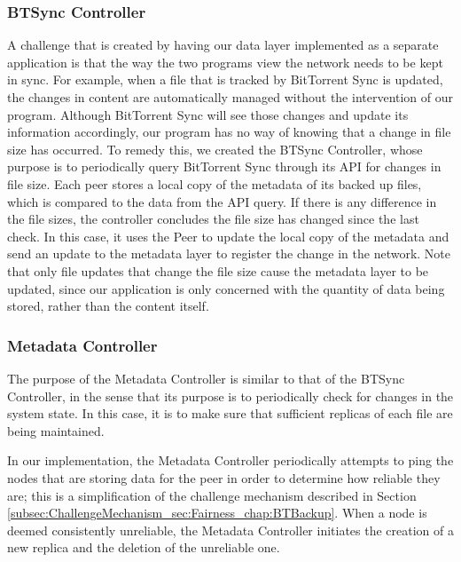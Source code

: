 \documentclass[12pt]{report}
\begin{document}
\subsubsection{BTSync Controller} \label{subsubsec:BTSyncController_subsec:SystemCore_sec:SystemDesign_chap:Implementation}
A challenge that is created by having our data layer implemented as a separate application is that the way the two programs view the network needs to be kept in sync. For example, when a file that is tracked by BitTorrent Sync is updated, the changes in content are automatically managed without the intervention of our program. Although BitTorrent Sync will see those changes and update its information accordingly, our program has no way of knowing that a change in file size has occurred. To remedy this, we created the BTSync Controller, whose purpose is to periodically query BitTorrent Sync through its API for changes in file size. Each peer stores a local copy of the metadata of its backed up files, which is compared to the data from the API query. If there is any difference in the file sizes, the controller concludes the file size has changed since the last check. In this case, it uses the Peer to update the local copy of the metadata and send an update to the metadata layer to register the change in the network. Note that only file updates that change the file size cause the metadata layer to be updated, since our application is only concerned with the quantity of data being stored, rather than the content itself.

\subsubsection{Metadata Controller} \label{subsubsec:MetadataController_subsec:SystemCore_sec:SystemDesign_chap:Implementation}
The purpose of the Metadata Controller is similar to that of the BTSync Controller, in the sense that its purpose is to periodically check for changes in the system state. In this case, it is to make sure that sufficient replicas of each file are being maintained.

In our implementation, the Metadata Controller periodically attempts to ping the nodes that are storing data for the peer in order to determine how reliable they are; this is a simplification of the challenge mechanism described in Section \ref{subsec:ChallengeMechanism_sec:Fairness_chap:BTBackup}. When a node is deemed consistently unreliable, the Metadata Controller initiates the creation of a new replica and the deletion of the unreliable one.
\end{document}
